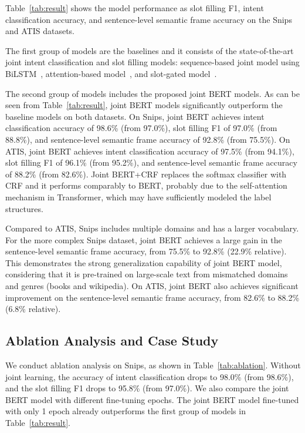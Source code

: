 \documentclass[11pt,a4paper]{article}
\begin{document}
Table~\ref{tab:result} shows the model performance as slot filling F1, intent classification accuracy, and sentence-level semantic frame accuracy on the Snips and ATIS datasets.

The first group of models are the baselines and it consists of the state-of-the-art joint intent classification and slot filling models: sequence-based joint model using BiLSTM~\citep{DBLP:conf/interspeech/Hakkani-TurTCCG16}, attention-based model~\citep{DBLP:conf/interspeech/LiuL16}, and slot-gated model~\citep{DBLP:conf/naacl/GooGHHCHC18}. 

The second group of models includes the proposed joint BERT models. As can be seen from Table~\ref{tab:result}, joint BERT models significantly outperform the baseline models on both datasets. On Snips, joint BERT achieves intent classification accuracy of 98.6\% (from 97.0\%), slot filling F1 of 97.0\% (from 88.8\%), and sentence-level semantic frame accuracy of 92.8\% (from 75.5\%). On ATIS, joint BERT achieves intent classification accuracy of 97.5\% (from 94.1\%), slot filling F1 of 96.1\% (from 95.2\%), and sentence-level semantic frame accuracy of 88.2\% (from 82.6\%). 
Joint BERT+CRF replaces the softmax classifier with CRF and it performs comparably to BERT, probably due to the self-attention mechanism in Transformer, which may have sufficiently modeled the label structures.

Compared to ATIS, Snips includes multiple domains and has a larger vocabulary. For the more complex Snips dataset, joint BERT achieves a large gain in the sentence-level semantic frame accuracy, from 75.5\% to 92.8\% (22.9\% relative). This demonstrates the strong generalization capability of joint BERT model, considering that it is pre-trained on large-scale text from mismatched domains and genres (books and wikipedia). On ATIS, joint BERT also achieves significant improvement on the sentence-level semantic frame accuracy, from 82.6\% to 88.2\% (6.8\% relative).

\subsection{Ablation Analysis and Case Study}
We conduct ablation analysis on Snips, as shown in Table~\ref{tab:ablation}. Without joint learning, the accuracy of intent classification drops to 98.0\% (from 98.6\%), and the slot filling F1 drops to 95.8\% (from 97.0\%). We also compare the joint BERT model with different fine-tuning epochs. The joint BERT model fine-tuned with only 1 epoch already outperforms the first group of models in Table~\ref{tab:result}.
\end{document}
